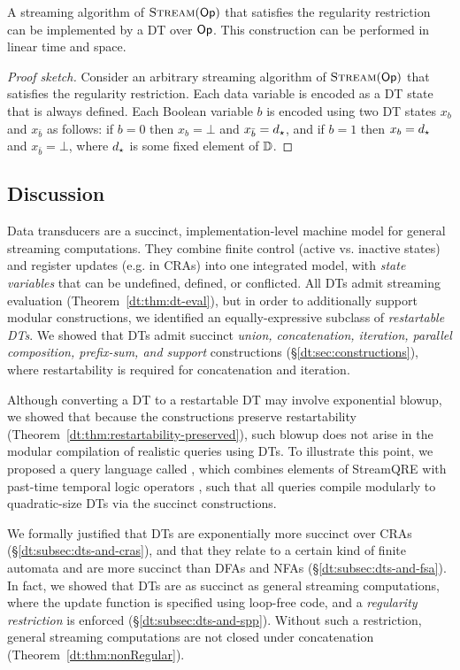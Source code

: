 \begin{theorem}
A streaming algorithm of $\textsc{Stream}(\textsf{Op})$ that satisfies the regularity restriction can be implemented by a DT over $\textsf{Op}$. This construction can be performed in linear time and space.
\end{theorem}
\begin{proof}[Proof sketch]
Consider an arbitrary streaming algorithm of $\textsc{Stream}(\textsf{Op})$ that satisfies the regularity restriction. Each data variable is encoded as a DT state that is always defined. Each Boolean variable $b$ is encoded using two DT states $x_b$ and $x_{\bar b}$ as follows: if $b = 0$ then $x_b = \bot$ and $x_{\bar b} = d_\star$, and if $b = 1$ then $x_b = d_\star$ and $x_{\bar b} = \bot$, where $d_\star$ is some fixed element of $\mathbb{D}$.
\end{proof}

\subsection{Discussion}

Data transducers are a succinct, implementation-level machine model for general streaming computations.
They combine finite control (active vs. inactive states) and
register updates (e.g. in CRAs) into one integrated model, with \emph{state variables} that can be
undefined, defined, or conflicted.
All DTs admit streaming evaluation (Theorem~\ref{dt:thm:dt-eval}), but in order to additionally support modular constructions, we identified an equally-expressive subclass of \emph{restartable DTs}.
We showed that DTs admit succinct \emph{union, concatenation, iteration, parallel composition, prefix-sum, and support} constructions (\S\ref{dt:sec:constructions}), where restartability is required for concatenation and iteration.

Although converting a DT to a restartable DT may involve exponential blowup, we showed that because the constructions preserve restartability (Theorem~\ref{dt:thm:restartability-preserved}), such blowup does not arise in the modular compilation of realistic queries using DTs. To illustrate this point, we proposed a query language called \QREpast{}, which combines elements of StreamQRE \cite{MRAIK2017SQRE} with past-time temporal logic operators \cite{havelund2004efficient}, such that all queries compile modularly to quadratic-size DTs via the succinct constructions.

We formally justified that DTs are exponentially more succinct over CRAs (\S\ref{dt:subsec:dts-and-cras}), and that they relate to a certain kind of finite automata and are more succinct than DFAs and NFAs (\S\ref{dt:subsec:dts-and-fsa}). In fact, we showed that DTs are as succinct as general streaming computations, where the update function is specified using loop-free code, and a \emph{regularity restriction} is enforced (\S\ref{dt:subsec:dts-and-spp}). Without such a restriction, general streaming computations are not closed under concatenation (Theorem~\ref{dt:thm:nonRegular}).

